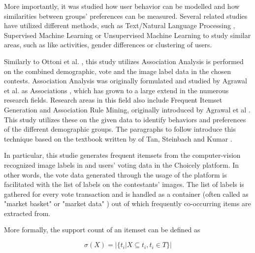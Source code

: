More importantly, it was studied how user behavior can be modelled and how similarities between groups' preferences can be measured. Several related studies have utilized different methods, such as Text/Natural Language Processing \cite{ottoni2013ladies, farseev2015harvestingmultiplesources, jang2016teensengagemorewithfewerphotos, kabinsingha2012movie, han2016teensarefrommars}, Supervised Machine Learning \cite{chinesemobilebankingusers, saraee2004data, kabinsingha2012movie, farseev2015harvestingmultiplesources, han2016teensarefrommars, jang2015no, bakhshi2014faces} or Unsupervised Machine Learning \cite{saraee2004data, hu2014we, jang2015no} to study similar areas, such as like activities, gender differences or clustering of users. 

Similarly to Ottoni et al. \cite{ottoni2013ladies}, this study utilizes Association Analysis is performed on the combined demographic, vote and the image label data in the chosen contests. Association Analysis was originally formulated and studied by Agrawal et al. as Associations \cite{database_mining_agrawal, mining_association_rules_agrawal}, which has grown to a large extend in the numerous research fields. Research areas in this field also include Frequent Itemset Generation and Association Rule Mining, originally introduced by Agrawal et al \cite{database_mining_agrawal, mining_association_rules_agrawal}. This study utilizes these on the given data to identify behaviors and preferences of the different demographic groups. The paragraphs to follow introduce this technique based on the textbook written by of Tan, Steinbach and Kumar \cite{introtodatamining}.

In particular, this studie generates frequent itemsets from the computer-vision recognized image labels in and users' voting data in the Choicely platform. In other words, the vote data generated through the usage of the platform is facilitated with the list of labels on the contestants' images. The list of labels is gathered for every vote transaction and is handled as a container (often called as "market basket" or "market data" \cite{Brin97dynamicitemset, Brin1997BeyondMB, Raeder2010MarketBA}) out of which frequently co-occurring items are extracted from. 

More formally, the support count of an itemset can be defined as

\begin{equation}
    \sigma (X) = |\{ t_i | X \subseteq t_i, t_i \in T \}|
\end{equation}

